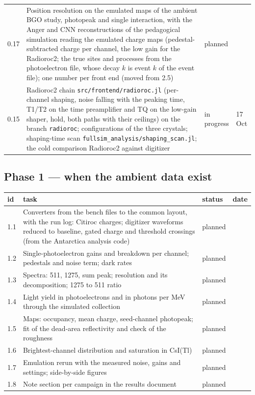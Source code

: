 \documentclass[11pt]{article}
\newcommand{\code}[1]{\texttt{#1}}
\newcommand{\csitl}{CsI(Tl)\xspace}
\newcommand{\planned}{planned}
\newcommand{\doing}{in progress}
\begin{document}
\begin{longtable}{p{} p{} p{} p{}}
0.17 & Position resolution on the emulated maps of the ambient BGO study, photopeak and single interaction, with the Anger and CNN reconstructions of the pedagogical simulation reading the emulated charge maps (pedestal-subtracted charge per channel, the low gain for the Radioroc2; the true sites and processes from the photoelectron file, whose decay $k$ is event $k$ of the event file); one number per front end (moved from 2.5) & \planned & \\
0.15 & Radioroc2 chain \code{src/frontend/radioroc.jl} (per-channel shaping, noise falling with the peaking time, T1/T2 on the time preamplifier and TQ on the low-gain shaper, hold, both paths with their ceilings) on the branch \code{radioroc}; configurations of the three crystals; shaping-time scan \code{fullsim\_analysis/shaping\_scan.jl}; the cold comparison Radioroc2 against digitizer & \doing & 17 Oct \\
\bottomrule
\end{longtable}

\subsection*{Phase 1 --- when the ambient data exist}

\begin{longtable}{p{} p{} p{} p{}}
\toprule
id & task & status & date \\
\midrule
\endhead
1.1 & Converters from the bench files to the common layout, with the run log: Citiroc charges; digitizer waveforms reduced to baseline, gated charge and threshold crossings (from the Antarctica analysis code) & \planned & \\
1.2 & Single-photoelectron gains and breakdown per channel; pedestals and noise term; dark rates & \planned & \\
1.3 & Spectra: 511, 1275, sum peak; resolution and its decomposition; 1275 to 511 ratio & \planned & \\
1.4 & Light yield in photoelectrons and in photons per MeV through the simulated collection & \planned & \\
1.5 & Maps: occupancy, mean charge, seed-channel photopeak; fit of the dead-area reflectivity and check of the roughness & \planned & \\
1.6 & Brightest-channel distribution and saturation in \csitl & \planned & \\
1.7 & Emulation rerun with the measured noise, gains and settings; side-by-side figures & \planned & \\
1.8 & Note section per campaign in the results document & \planned & \\
\bottomrule
\end{longtable}
\end{document}
